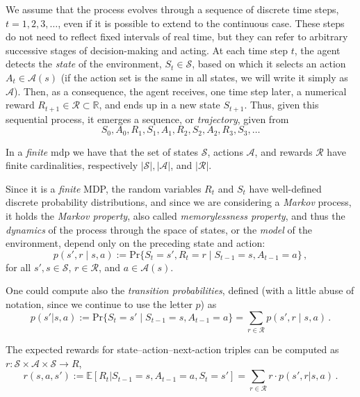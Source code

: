 We assume that the process evolves through a sequence of discrete time steps, $t = 1, 2, 3, \ldots$, even if it is possible to extend to the continuous case. These steps do not need to reflect fixed intervals of real time, but they can refer to arbitrary successive stages of decision-making and acting. At each time step $t$, the agent detects the \emph{state} of the environment, $S_t \in \mathcal S$, based on which it selects an action $A_t \in \mathcal A(s)$ (if the action set is the same in all states, we will write it simply as $\mathcal A$). Then, as a consequence, the agent receives, one time step later, a numerical reward $R_{t+1} \in \mathcal R \subset \mathbb R$, and ends up in a new state $S_{t+1}$. Thus, given this sequential process, it emerges a sequence, or \emph{trajectory}, given from
\begin{equation}
    S_0, A_0, R_1, S_1, A_1, R_2, S_2, A_2, R_3, S_3, \ldots
\end{equation}

In a \emph{finite} \acrshort{mdp} we have that the set of states $\mathcal S$, actions $\mathcal A$, and rewards $\mathcal R$ have finite cardinalities, respectively $|\mathcal S|, |\mathcal A|$, and $|\mathcal R|$.

Since it is a \textit{finite} MDP, the random variables $R_t$ and $S_t$ have well-defined discrete probability distributions, and since we are considering a \textit{Markov} process, it holds the \emph{Markov property}, also called \emph{memorylessness property}, and thus the \emph{dynamics} of the process through the space of states, or the \emph{model} of the environment, depend only on the preceding state and action:
\begin{equation}
    p(s', r \mid s, a) := \text{Pr}\{S_t = s', R_t = r \mid S_{t-1} = s, A_{t-1} = a\} \, ,
    \label{eq:transitions}
\end{equation}
for all $s', s \in \mathcal S$, $r \in \mathcal R$, and $a \in \mathcal A(s)$.

One could compute also the \emph{transition probabilities}, defined (with a little abuse of notation, since we continue to use the letter $p$) as
\begin{equation}
    p(s'|s, a) := \text{Pr}\{S_t = s' \mid S_{t-1} = s, A_{t-1} = a\} = \sum_{r \in \mathcal R} p(s', r \mid s, a) \, .
\end{equation}

The expected rewards for state--action--next-action triples can be computed as $r: \mathcal S \times \mathcal A \times \mathcal S \to R$,
\begin{equation}
    r(s, a, s') := \mathbb E \left[ R_t | S_{t-1} = s, A_{t-1} = a, S_t = s' \right] = \sum_{r \in \mathcal R} r \cdot p(s', r | s, a) \, .
\end{equation}

